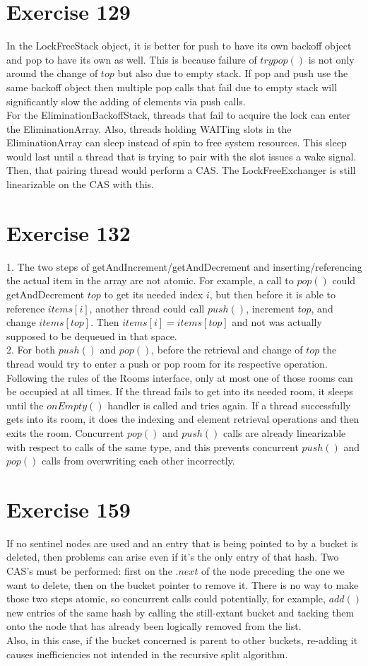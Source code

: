 \documentclass{article}
\begin{document}
\begin{adjustwidth}{-2cm}{-2cm}
\section{Exercise 129}
In the LockFreeStack object, it is better for push to have its own backoff object and pop to have its own as well. This is because failure of $trypop()$ is not only around the change of $top$ but also due to empty stack. If pop and push use the same backoff object then multiple pop calls that fail due to empty stack will significantly slow the adding of elements via push calls.\\
For the EliminationBackoffStack, threads that fail to acquire the lock can enter the EliminationArray. Also, threads holding WAITing slots in the EliminationArray can sleep instead of spin to free system resources. This sleep would last until a thread that is trying to pair with the slot issues a wake signal. Then, that pairing thread would perform a CAS. The LockFreeExchanger is still linearizable on the CAS with this.
\section{Exercise 132}
1. The two steps of getAndIncrement/getAndDecrement and inserting/referencing the actual item in the array are not atomic. For example, a call to $pop()$ could getAndDecrement $top$ to get its needed index $i$, but then before it is able to reference $items[i]$, another thread could call $push()$, increment $top$, and change $items[top]$. Then $items[i] = items[top]$ and not was actually supposed to be dequeued in that space.\\
2. For both $push()$ and $pop()$, before the retrieval and change of $top$ the thread would try to enter a push or pop room for its respective operation. Following the rules of the Rooms interface, only at most one of those rooms can be occupied at all times. If the thread fails to get into its needed room, it sleeps until the $onEmpty()$ handler is called and tries again. If a thread successfully gets into its room, it does the indexing and element retrieval operations and then exits the room. Concurrent $pop()$ and $push()$ calls are already linearizable with respect to calls of the same type, and this prevents concurrent $push()$ and $pop()$ calls from overwriting each other incorrectly.
\section{Exercise 159}
If no sentinel nodes are used and an entry that is being pointed to by a bucket is deleted, then problems can arise even if it's the only entry of that hash. Two CAS's must be performed: first on the $.next$ of the node preceding the one we want to delete, then on the bucket pointer to remove it. There is no way to make those two steps atomic, so concurrent calls could potentially, for example, $add()$ new entries of the same hash by calling the still-extant bucket and tacking them onto the node that has already been logically removed from the list.\\
Also, in this case, if the bucket concerned is parent to other buckets, re-adding it causes inefficiencies not intended in the recursive split algorithm.

\end{adjustwidth}
\end{document}
